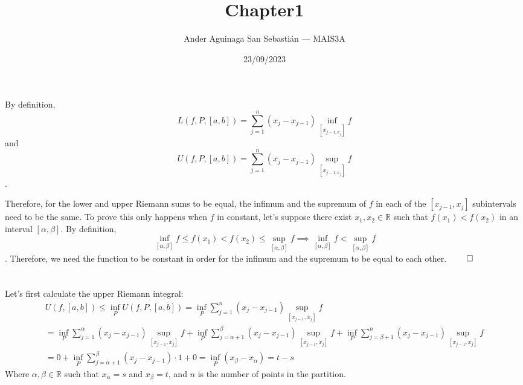 \documentclass[11pt, a4paper, tikz]{article}
\newcommand{\newpara}{
	\vskip 2mm
}
\newcommand{\centsection}[1]{
	\section*{\centering{#1}}
}
\begin{document}
	\title{\textbf{Chapter1}}
	\author{Ander Aguinaga San Sebastián — MAIS3A}
	\date{23/09/2023}
	\maketitle
	\centsection{Exercise 1}
	By definition,
	\begin{equation*}
		L(f, P, [a, b]) = \sum_{j=1}^{n}(x_j-x_{j-1})\inf_{[x_{j-1,x_j}]}f
	\end{equation*}
	and
		\begin{equation*}
		U(f, P, [a, b]) = \sum_{j=1}^{n}(x_j-x_{j-1})\sup_{[x_{j-1,x_j}]}f
	\end{equation*}
	.
	\newpara
	Therefore, for the lower and upper Riemann sums to be equal, the infimum and the supremum of $f$ in each of the $[x_{j-1},x_j]$ subintervals need to be the same. To prove this only happens when $f$ in constant, let's suppose there exist $x_1, x_2\in\mathbb{R}$ such that $f(x_1) < f(x_2)$ in an interval $[\alpha,\beta]$. By definition,
	\begin{equation*}
		\inf_{[\alpha,\beta]}f \leq f(x_1) < f(x_2) \leq  \sup_{[\alpha,\beta]}f \implies \inf_{[\alpha,\beta]}f < \sup_{[\alpha,\beta]}f
	\end{equation*}. Therefore, we need the function to be constant in order for the infimum and the supremum to be equal to each other.
	$\qed$
	
	\centsection{Exercise 2}
	
	\begin{center}
	\end{center}
	\newpara
	Let's first calculate the upper Riemann integral:
	\begin{align*}
		U(f, [a,b]) \leq \inf_PU(f, P, [a,b]) = \inf_P\sum_{j=1}^n(x_j-x_{j-1})\sup_{[x_{j-1},x_j]}f\\
		=\inf_P\sum_{j=1}^\alpha(x_j-x_{j-1})\sup_{[x_{j-1},x_j]}f+\inf_P\sum_{j=\alpha+1}^\beta(x_j-x_{j-1})\sup_{[x_{j-1},x_j]}f+\inf_P\sum_{j=\beta+1}^n(x_j-x_{j-1})\sup_{[x_{j-1},x_j]}f\\
		=0+\inf_P\sum_{j=\alpha+1}^\beta(x_j-x_{j-1})\cdot1+0=\inf_P(x_\beta-x_{\alpha})=t-s
	\end{align*}
	Where $\alpha,\beta\in\mathbb{R}$ such that $x_\alpha=s$ and $x_\beta=t$, and $n$ is the number of points in the partition.
	
\end{document}
